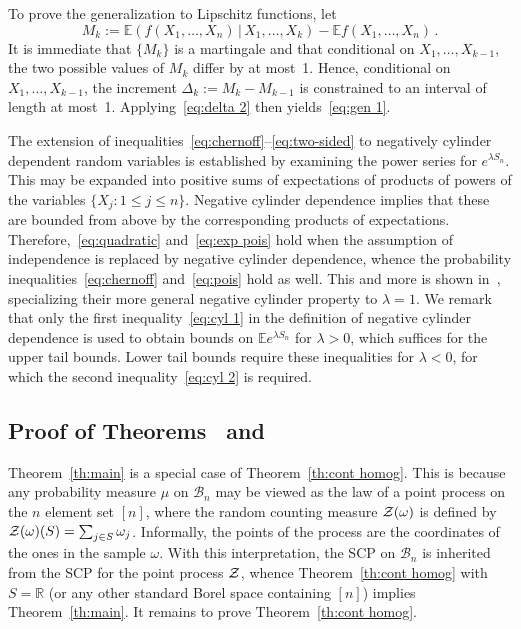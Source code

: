 \documentclass[10pt]{article}
\theoremstyle{plain}
\theoremstyle{remark}
\def\R{\mathbb{R}}
\def\E{{\mathbb E}}
\def\|{{\, | \, }}
\def\B{{\mathcal B}}
\def\ZZ{{\cal Z}}
\begin{document}
To prove the generalization to Lipschitz functions, let
$$M_k := \E \left ( f(X_1 , \ldots , X_n) \| X_1 , \ldots , X_k
   \right ) - \E f(X_1 , \ldots , X_n) \, .$$
It is immediate that $\{ M_k \}$ is a martingale and that
conditional on $X_1 , \ldots , X_{k-1}$, the two possible values
of $M_k$ differ by at most~1.  Hence, conditional on
$X_1 , \ldots , X_{k-1}$, the increment $\Delta_k := M_k - M_{k-1}$
is constrained to an interval of length at most~1.
Applying~\eqref{eq:delta 2} then yields~\eqref{eq:gen 1}.

The extension of inequalities~\eqref{eq:chernoff}--\eqref{eq:two-sided}
to negatively cylinder dependent random variables is established
by examining the power series for $e^{\lambda S_n}$.  This
may be expanded into positive sums of expectations of products
of powers of the variables $\{ X_j : 1 \leq j \leq n \}$.
Negative cylinder dependence implies that
these are bounded from above by the corresponding products of
expectations.  Therefore,~\eqref{eq:quadratic} and~\eqref{eq:exp pois}
hold when the assumption of independence is replaced by negative cylinder
dependence, whence the probability inequalities~\eqref{eq:chernoff}
and~\eqref{eq:pois} hold as well.  This and more is shown
in~\cite[Theorem~3.4]{panconesi-srinivasan}, specializing
their more general negative cylinder property to $\lambda = 1$.
We remark that only the first inequality~\eqref{eq:cyl 1}
in the definition of negative cylinder dependence
is used to obtain bounds on $\E e^{\lambda S_n}$ for $\lambda > 0$,
which suffices for the upper tail bounds.  Lower tail bounds require
these inequalities for $\lambda < 0$, for which the second
inequality~\eqref{eq:cyl 2} is required.

\subsection{Proof of Theorems~\protect{\ref{th:main}}
and~\protect{\ref{th:cont homog}}}

Theorem~\ref{th:main} is a special case of Theorem~\ref{th:cont homog}.
This is because any probability measure $\mu$ on $\B_n$ may be viewed
as the law of a point process on the $n$ element set $[n]$, where
the random counting measure $\ZZ (\omega)$ is defined by
$\ZZ (\omega) (S) = \sum_{j \in S} \omega_j$.  Informally,
the points of the process are the coordinates of the ones
in the sample $\omega$.  With this interpretation, the SCP
on $\B_n$ is inherited from the SCP for the point process $\ZZ$,
whence Theorem~\ref{th:cont homog} with $S = \R$ (or any other
standard Borel space containing $[n]$) implies Theorem~\ref{th:main}.
It remains to prove Theorem~\ref{th:cont homog}.
\end{document}
